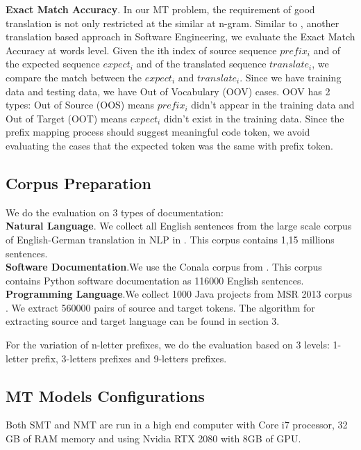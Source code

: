 \textbf{Exact Match Accuracy}. In our MT problem, the requirement of good translation is not only restricted at the similar at n-gram. Similar to \cite{028}, another translation based approach in Software Engineering, we evaluate the Exact Match Accuracy at words level. Given the ith index of source sequence $prefix_{i}$ and of the expected sequence $expect_{i}$ and of the translated sequence $translate_{i}$, we compare the match between the $expect_{i}$ and $translate_{i}$. Since we have training data and testing data, we have Out of Vocabulary (OOV) cases. OOV has 2 types: Out of Source (OOS) means $prefix_{i}$ didn't appear in the training data and Out of Target (OOT) means $expect_{i}$ didn't exist in the training data. Since the prefix mapping process should suggest meaningful code token, we avoid evaluating the cases that the expected token was the same with prefix token. 

\subsection{Corpus Preparation}
We do the evaluation on 3 types of documentation:
\\
\textbf{Natural Language}. We collect all English sentences from the large scale corpus of English-German translation in NLP in \cite{040}. This corpus contains 1,15 millions sentences. 
\\
\textbf{Software Documentation}.We use the Conala corpus from \cite{046}. This corpus contains Python software documentation as 116000 English sentences.
\\
\textbf{Programming Language}.We collect 1000 Java projects from MSR 2013 corpus \cite{031}. We extract 560000 pairs of source and target tokens. The algorithm for extracting source and target language can be found in section 3.

For the variation of n-letter prefixes, we do the evaluation based on 3 levels: 1-letter prefix, 3-letters prefixes and 9-letters prefixes.




\subsection{MT Models Configurations}
Both SMT and NMT are run in a high end computer with Core i7 processor, 32 GB of RAM memory and using Nvidia RTX 2080 with 8GB of GPU.
